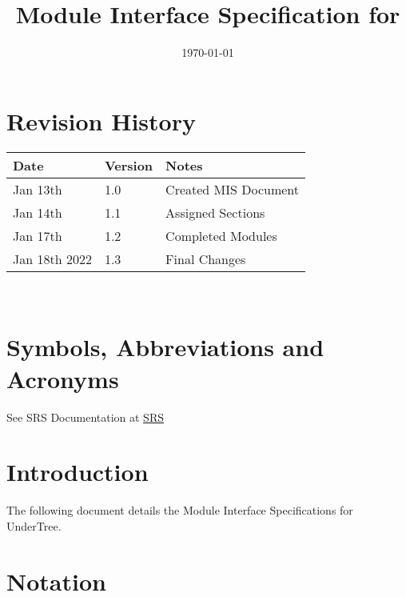 \documentclass[12pt, titlepage]{article}
\begin{document}
	
	\title{Module Interface Specification for \progname{}}
	
	\author{\authname}
	
	\date{\today}
	
	\maketitle
	
	
	\section{Revision History}
	
	\begin{tabularx}{\textwidth}{p{3cm}p{2cm}X}
		\toprule {\bf Date} & {\bf Version} & {\bf Notes}\\
		\midrule
		Jan 13th & 1.0 & Created MIS Document\\
		Jan 14th & 1.1 & Assigned Sections\\
		Jan 17th & 1.2 & Completed Modules\\
		Jan 18th 2022 & 1.3 & Final Changes\\
		\bottomrule
	\end{tabularx}
	
	~\newpage
	
	\section{Symbols, Abbreviations and Acronyms}
	
	See SRS Documentation at \href{https://github.com/RutheniumVI/UnderTree/blob/main/docs/SRS/SRS.pdf}{SRS}
	
	\newpage
	
	\tableofcontents
	
	\newpage
	
	
	\section{Introduction}
	
	The following document details the Module Interface Specifications for
	UnderTree.
	
	
	\section{Notation}
	
\end{document}
